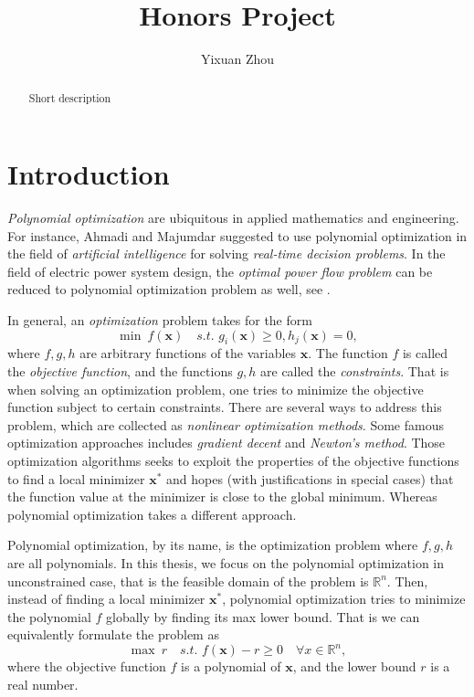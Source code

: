 \documentclass[12pt]{amsart}
\title{Honors Project}
\author{Yixuan Zhou} %
\numberwithin{equation}{section}
\theoremstyle{definition}
\numberwithin{thm}{section}
\begin{document}
 

\begin{abstract}
Short description
\end{abstract}

\maketitle


\section{Introduction} 

\emph{Polynomial optimization} are ubiquitous in applied mathematics and engineering. 
For instance, Ahmadi and Majumdar \cite{ahmadi2015applications} suggested to use
polynomial optimization in the field of \emph{artificial intelligence} for solving
\emph{real-time decision problems}. 
In the field of electric power system design, the \emph{optimal power flow problem}
can be reduced to polynomial optimization problem as well, see \cite{josz:tel-01478431}.

In general, an \emph{optimization} problem takes for the form 
\begin{equation*}
     \min \ f(\mathbf{x}) \quad \textit{s.t. } g_i(\mathbf{x}) \geq 0, h_j(\mathbf{x}) = 0,
 \end{equation*}
where $f, g, h$ are arbitrary functions of the variables $\mathbf{x}$. 
The function $f$ is called the \emph{objective function}, and the functions $g, h$ are called the \emph{constraints}.
That is when solving an optimization problem, one tries to minimize the objective function subject to certain constraints.
There are several ways to address this problem, which are collected as \emph{nonlinear optimization methods}. 
Some famous optimization approaches includes \emph{gradient decent} and \emph{Newton's method}. 
Those optimization algorithms seeks to exploit the properties of the objective functions to find a
local minimizer $\mathbf{x}^*$ and hopes (with justifications in special cases) that the function value at the minimizer is close
to the global minimum. Whereas polynomial optimization takes a different approach.

Polynomial optimization, by its name, is the optimization problem where $f, g, h$ are all polynomials.
In this thesis, we focus on the polynomial optimization in unconstrained case, that is the feasible domain of the problem is $\mathbb{R}^n$.
Then, instead of finding a local minimizer $\mathbf{x}^*$, polynomial optimization tries to minimize the polynomial $f$ globally by finding its max lower bound.
That is we can equivalently formulate the problem as 
\begin{equation*}
     \max \ r \quad \textit{s.t. } f(\mathbf{x}) - r \geq 0 \quad \forall x \in \mathbb{R}^n,
 \end{equation*}
where the objective function $f$ is a polynomial of $\mathbf{x}$, and the lower bound $r$ is a real number. 
\end{document}
